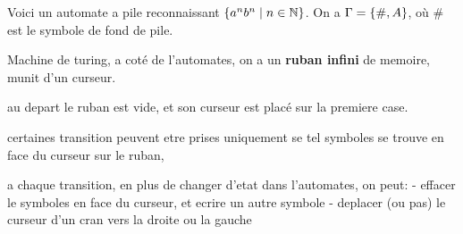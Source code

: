     
    \begin{example}{}{}
        Voici un automate a pile reconnaissant $\left\{a^nb^n \;\middle\vert\; n \in \mathbb{N}\right\}$. On a $\Gamma = \left\{\#, A\right\}$, où $\#$ est le symbole de fond de pile.
    
        \begin{center}
        \end{center}
    \end{example}
    
 Machine de turing, a coté de l'automates, on a  un \textbf{ruban infini } de memoire, munit d'un curseur.
 
 
 au depart le ruban est vide, et son curseur est placé sur la premiere case.
 
 
certaines transition peuvent etre prises uniquement se tel symboles se trouve en face du curseur sur le ruban, 

a chaque transition, en plus de changer d'etat dans l'automates, on peut: 
    - effacer le symboles en face du curseur, et ecrire un autre symbole
    - deplacer (ou pas) le curseur d'un cran vers la droite ou la gauche
